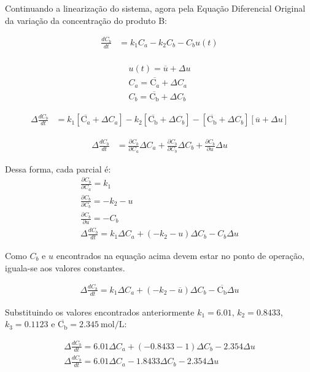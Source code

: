 \documentclass[a4paper,12pt]{report}
\begin{document}
Continuando a linearização do sistema, agora pela Equação Diferencial Original da variação da concentração do produto B:

\begin{align}
\frac{dC_b}{dt} &= k_1 C_a - k_2 C_b - C_b u(t)\\
\end{align}

\begin{align}
u(t) = \overline{u} + \Delta{u}\\
C_a = \overline{\mathrm{C}_a} + \Delta{C}_a\\
C_b = \overline{\mathrm{C_b}} + \Delta{C_b}
\end{align}

\begin{align}
\Delta\frac{dC_b}{dt} &= k_1 [\overline{\mathrm{C}_a} + \Delta{C}_a] - k_2 [\overline{\mathrm{C_b}} + \Delta{C_b}] - [\overline{\mathrm{C_b}} + \Delta{C_b}][\overline{u} + \Delta{u}]
\end{align}

\begin{align}
\Delta\frac{dC_b}{dt} &= \frac{\partial C_b}{\partial C_a}\Delta C_a + \frac{\partial C_b}{\partial C_b}\Delta C_b + \frac{\partial C_b}{\partial u}\Delta u
\end{align}

Dessa forma, cada parcial é: \\

\begin{align}
\frac{\partial C_b}{\partial C_a} = k_1\\
\frac{\partial C_b}{\partial C_b} = -k_2 - u\\
\frac{\partial C_b}{\partial u} = -C_b\\
\Delta\frac{dC_b}{dt} = k_1\Delta C_a + (-k_2-u)\Delta C_b - C_b\Delta u
\end{align}

Como \(C_b\) e \(u\) encontrados na equação acima devem estar no ponto de operação, iguala-se aos valores constantes.


\begin{align}
\Delta\frac{dC_b}{dt} = k_1\Delta C_a + (-k_2-\overline{u})\Delta C_b - \overline{\mathrm{C_b}}\Delta u
\end{align}

Substituindo os valores encontrados anteriormente \(k_1 = 6.01\), \(k_2 = 0.8433\), \(k_3 = 0.1123\) e \(\overline{\mathrm{C_b}} = 2.345\ \text{mol/L}\):

\begin{align}
\Delta\frac{dC_b}{dt} = 6.01 \Delta C_a + (-0.8433-1)\Delta C_b - 2.354 \Delta u\\
\Delta\frac{dC_b}{dt} = 6.01 \Delta C_a -1.8433\Delta C_b - 2.354 \Delta u
\end{align}
\end{document}
